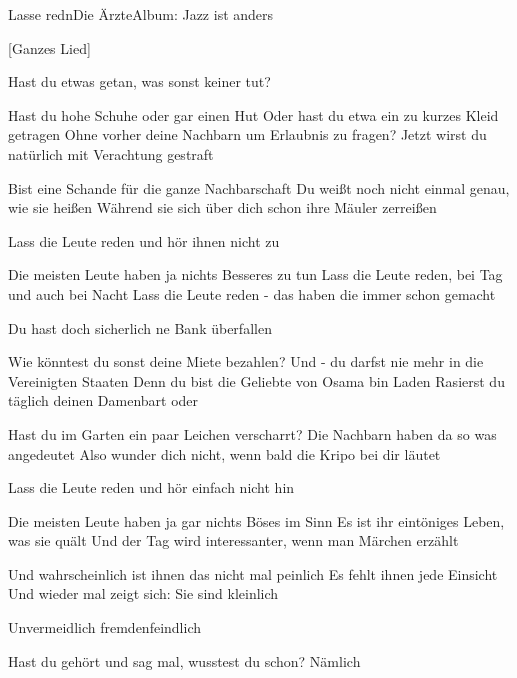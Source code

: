 \begin{song}{Lasse redn}{Die Ärzte}{Album: Jazz ist anders}

 [Ganzes Lied]

Hast du etwas getan, was sonst keiner tut?

Hast du hohe Schuhe oder gar einen Hut
Oder hast du etwa ein zu kurzes Kleid getragen
Ohne vorher deine Nachbarn um Erlaubnis zu fragen?
Jetzt wirst du natürlich mit Verachtung gestraft

Bist eine Schande für die ganze Nachbarschaft
Du weißt noch nicht einmal genau, wie sie heißen
Während sie sich über dich schon ihre Mäuler zerreißen

Lass die Leute reden und hör ihnen nicht zu

Die meisten Leute haben ja nichts Besseres zu tun
Lass die Leute reden, bei Tag und auch bei Nacht
Lass die Leute reden - das haben die immer schon gemacht

Du hast doch sicherlich ne Bank überfallen

Wie könntest du sonst deine Miete bezahlen?
Und - du darfst nie mehr in die Vereinigten Staaten
Denn du bist die Geliebte von Osama bin Laden
Rasierst du täglich deinen Damenbart oder

Hast du im Garten ein paar Leichen verscharrt?
Die Nachbarn haben da so was angedeutet
Also wunder dich nicht, wenn bald die Kripo bei dir läutet

Lass die Leute reden und hör einfach nicht hin

Die meisten Leute haben ja gar nichts Böses im Sinn
Es ist ihr eintöniges Leben, was sie quält
Und der Tag wird interessanter, wenn man Märchen erzählt

Und wahrscheinlich ist ihnen das nicht mal peinlich
Es fehlt ihnen jede Einsicht
Und wieder mal zeigt sich: Sie sind kleinlich

Unvermeidlich fremdenfeindlich

Hast du gehört und sag mal, wusstest du schon? Nämlich


\end{song}
